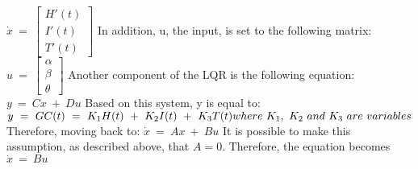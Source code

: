 \begin{math}
\dot{x} \ =\ \begin{bmatrix}
H'( t)\\
I'( t)\\
T'( t)
\end{bmatrix}
\end{math}
\newline\newline
In addition, u, the input, is set to the following matrix:
\newline\newline
\begin{math}
u\ =\ \begin{bmatrix}
\alpha \\
\beta \\
\theta 
\end{bmatrix}
\end{math}
\newline\newline
Another component of the LQR is the following equation:
\newline\newline
\begin{math}
y\ =\ Cx\ +\ Du
\end{math}
\newline\newline
Based on this system, y is equal to: 
\newline\newline
\begin{math}
y\ =\ GC( t) \ =\ K_{1} H( t) \ +\ K_{2} I( t) \ +\ K_{3} T( t)\\
\\
where\ K_{1} ,\ K_{2} \ and\ K_{3} \ are\ variables
\end{math}
\newline\newline
Therefore, moving back to:
\newline\newline
\begin{math}
\dot{x} \ =\ Ax\ +\ Bu
\end{math}
\newline\newline
It is possible to make this assumption, as described above, that \begin{math} A = 0 \end{math}. Therefore, the equation becomes 
\begin{math}
\dot{x} \ =\ Bu
\end{math}
\newline\newline
